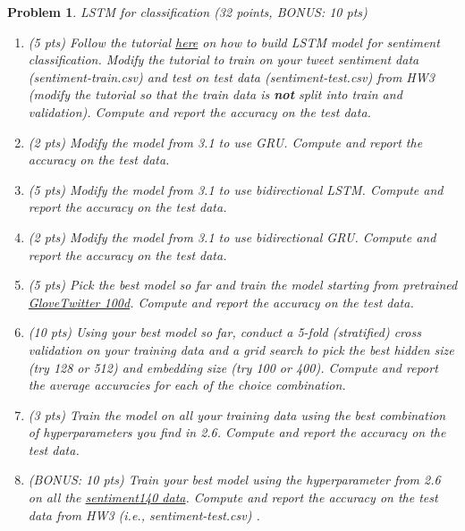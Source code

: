 \documentclass{article}
\newtheorem{problem}{Problem}
\begin{document}
\begin{problem} LSTM for classification (32 points, BONUS: 10 pts)
\begin{enumerate}
    \item (5 pts) Follow the tutorial \href{https://github.com/gabrielloye/LSTM_Sentiment-Analysis/blob/master/main.ipynb}{here} on how to build LSTM model for sentiment classification. Modify the tutorial to train on your tweet sentiment data (sentiment-train.csv) and test on test data (sentiment-test.csv) from HW3 (modify the tutorial so that the train data is \textbf{not} split into train and validation). Compute and report the accuracy on the test data. 
    \item (2 pts) Modify the model from 3.1 to use GRU. Compute and report the accuracy on the test data. 
    \item (5 pts) Modify the model from 3.1 to use bidirectional LSTM. Compute and report the accuracy on the test data. 
    \item (2 pts) Modify the model from 3.1 to use bidirectional GRU. Compute and report the accuracy on the test data. 
    \item (5 pts) Pick the best model so far and train the model starting from pretrained \href{https://nlp.stanford.edu/projects/glove/}{GloveTwitter 100d}. Compute and report the accuracy on the test data. 
    \item (10 pts) Using your best model so far, conduct a 5-fold (stratified) cross validation on your training data and a grid search to pick the best hidden size (try 128 or 512) and embedding size (try 100 or 400). Compute and report the average accuracies for each of the choice combination. 
    \item (3 pts) Train the model on all your training data using the best combination of hyperparameters you find in 2.6. Compute and report the accuracy on the test data. 
    \item (BONUS: 10 pts) Train your best model using the hyperparameter from 2.6 on all the \href{http://help.sentiment140.com/for-students/}{sentiment140 data}. Compute and report the accuracy on the test data from HW3 (i.e., sentiment-test.csv) . 
\end{enumerate}
\end{problem}
\end{document}
